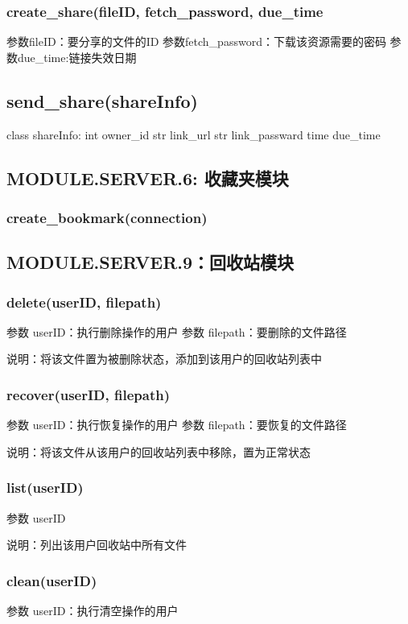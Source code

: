 \subsubsection{create_share(fileID, fetch_password, due_time}
参数fileID：要分享的文件的ID
参数fetch_password：下载该资源需要的密码
参数due_time:链接失效日期
\subsection{send_share(shareInfo)}
class shareInfo:
    int owner_id
    str link_url
    str link_passward
    time due_time

\subsection{MODULE.SERVER.6: 收藏夹模块}
\subsubsection{create_bookmark(connection)}


\subsection{MODULE.SERVER.9：回收站模块}

\subsubsection{delete(userID, filepath)}
参数 userID：执行删除操作的用户
参数 filepath：要删除的文件路径

说明：将该文件置为被删除状态，添加到该用户的回收站列表中

\subsubsection{recover(userID, filepath)}
参数 userID：执行恢复操作的用户
参数 filepath：要恢复的文件路径

说明：将该文件从该用户的回收站列表中移除，置为正常状态

\subsubsection{list(userID)}
参数 userID

说明：列出该用户回收站中所有文件

\subsubsection{clean(userID)}
参数 userID：执行清空操作的用户

